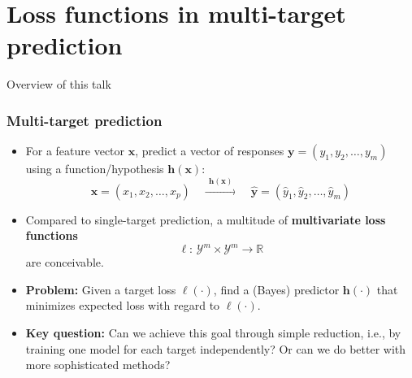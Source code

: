 \documentclass[]{beamer}
\newcommand{\bx}{\boldsymbol{x}}
\newcommand{\by}{\boldsymbol{y}}
\newcommand{\bh}{\boldsymbol{h}}
\renewcommand{\emph}[1]{\textbf{\color{putblue}#1}}
\begin{document}
\section{Loss functions in multi-target prediction}

\begin{frame}{Overview of this talk}

\tableofcontents

\end{frame}


\begin{frame}
\frametitle{Multi-target prediction}
\begin{itemize}
\item For a feature vector $\bx$, predict a vector of responses $\by = (y_1, y_2, \ldots, y_m)$ using a function/hypothesis $\bh(\bx)$:
$$
\bx = (x_1,x_2,\ldots,x_p) \quad \xrightarrow{~~\bh(\bx)~~} \quad \hat{\by} = ( \hat{y}_1, \hat{y}_2, \ldots, \hat{y}_m)
$$

\item Compared to single-target prediction, a multitude of \emph{multivariate loss functions} 
$$
\ell: \, \mathcal{Y}^m \times \mathcal{Y}^m \rightarrow \mathbb{R}
$$ 
are conceivable. 

\item \emph{Problem:} Given a target loss $\ell(\cdot)$, find a (Bayes) predictor $\bh(\cdot)$ that minimizes expected loss with regard to $\ell(\cdot)$. 

\item \emph{Key question:} Can we achieve this goal through simple reduction, i.e., by training one model for each target independently? Or can we do better with more sophisticated methods?  


\end{itemize}

\end{frame}
\end{document}
